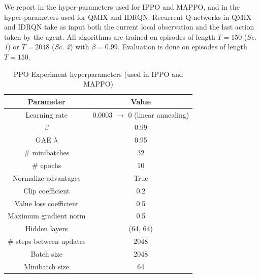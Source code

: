 \documentclass{article}
\begin{document}
We report in  the hyper-parameters used for IPPO and MAPPO, and in  the hyper-parameters used for QMIX and IDRQN. Recurrent Q-networks in QMIX and IDRQN take as input both the current local observation and the last action taken by the agent. All algorithms are trained on episodes of length $T=150$ (\textit{Sc. 1}) or $T=2048$ (\textit{Sc. 2}) with $\beta = 0.99$. Evaluation is done on episodes of length $T=150$. 
\begin{table}[!htb]
    \centering
    \begin{tabular}{c|c}
    \hline
    \textbf{Parameter} & \textbf{Value}\\
    \hline
    Learning rate & 0.0003 $\rightarrow$ 0 (linear annealing) \\
    $\beta$ & 0.99\\
    GAE $\lambda$ & 0.95\\
    \# minibatches & 32\\
    \# epochs & 10\\
    Normalize advantages & True\\
    Clip coefficient & 0.2\\
    Value loss coefficient & 0.5\\
    Maximum gradient norm & 0.5\\
    Hidden layers & (64, 64)\\
    \# steps between updates & 2048\\
    Batch size & 2048\\
    Minibatch size & 64\\
    \hline
    \end{tabular}
    \caption{PPO Experiment hyperparameters (used in IPPO and MAPPO)}
    \label{tab:parameters-ppo}
\end{table}
\end{document}

